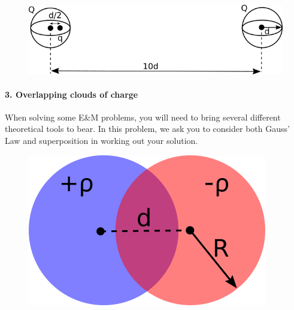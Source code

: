\documentclass[11pt]{article}
\begin{document}
\begin{figure}[htbp]
\centering
\includegraphics[width=0.9\linewidth]{./images/hw3/gre_problem.png}
\end{figure}

\paragraph{3. Overlapping clouds of
charge}\label{overlapping-clouds-of-charge}

When solving some E\&M problems, you will need to bring several
different theoretical tools to bear. In this problem, we ask you to
consider both Gauss' Law and superposition in working out your solution.

\begin{figure}[htbp]
\centering
\includegraphics[width=0.5\linewidth]{./images/hw3/overlapping_clouds.png}
\end{figure}
\end{document}

